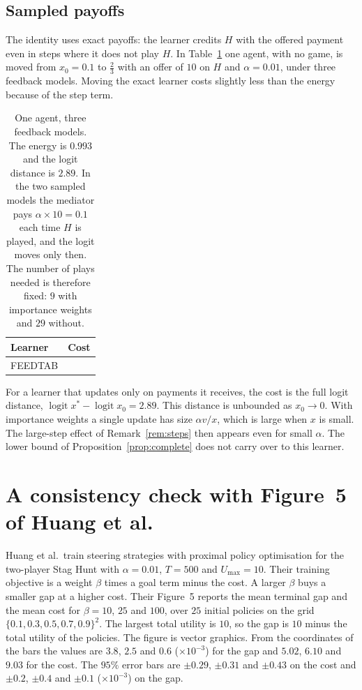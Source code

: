 \documentclass[11pt,a4paper]{article}
\theoremstyle{definition}
\theoremstyle{plain}
\newcommand{\xs}{x^{*}}
\begin{document}
\subsection{Sampled payoffs}\label{sec:feedback}

The identity uses exact payoffs: the learner credits $H$ with the offered payment even in steps where it does not play $H$. In Table~\ref{tab:feedback} one agent, with no game, is moved from $x_0=0.1$ to $\tfrac23$ with an offer of $10$ on $H$ and $\alpha=0.01$, under three feedback models. Moving the exact learner costs slightly less than the energy because of the step term.

\begin{table}[H]
\centering\small
\begin{tabular}{lr}
\toprule
Learner & Cost\\
\midrule
FEEDTAB
\bottomrule
\end{tabular}
\caption{One agent, three feedback models. The energy is $0.993$ and the logit distance is $2.89$. In the two sampled models the mediator pays $\alpha\times10=0.1$ each time $H$ is played, and the logit moves only then. The number of plays needed is therefore fixed: $9$ with importance weights and $29$ without.}\label{tab:feedback}
\end{table}

For a learner that updates only on payments it receives, the cost is the full logit distance, $\operatorname{logit}\xs-\operatorname{logit}x_0=2.89$. This distance is unbounded as $x_0\to0$. With importance weights a single update has size $\alpha v/x$, which is large when $x$ is small. The large-step effect of Remark~\ref{rem:steps} then appears even for small $\alpha$. The lower bound of Proposition~\ref{prop:complete} does not carry over to this learner.

\section{A consistency check with Figure~5 of Huang et al.}\label{sec:bench}

Huang et al.\ train steering strategies with proximal policy optimisation for the two-player Stag Hunt with $\alpha=0.01$, $T=500$ and $U_{\max}=10$. Their training objective is a weight $\beta$ times a goal term minus the cost. A larger $\beta$ buys a smaller gap at a higher cost. Their Figure~5 reports the mean terminal gap and the mean cost for $\beta=10$, $25$ and $100$, over $25$ initial policies on the grid $\{0.1,0.3,0.5,0.7,0.9\}^2$. The largest total utility is $10$, so the gap is $10$ minus the total utility of the policies. The figure is vector graphics. From the coordinates of the bars the values are $3.8$, $2.5$ and $0.6$ ($\times10^{-3}$) for the gap and $5.02$, $6.10$ and $9.03$ for the cost. The $95\%$ error bars are $\pm0.29$, $\pm0.31$ and $\pm0.43$ on the cost and $\pm0.2$, $\pm0.4$ and $\pm0.1$ ($\times10^{-3}$) on the gap.
\end{document}
